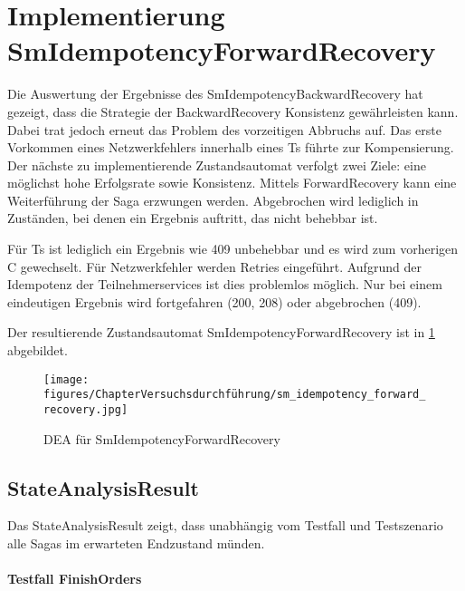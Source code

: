 \section{Implementierung SmIdempotencyForwardRecovery}
Die Auswertung der Ergebnisse des SmIdempotencyBackwardRecovery hat gezeigt, dass die Strategie der BackwardRecovery Konsistenz gewährleisten kann. Dabei trat jedoch erneut das Problem des vorzeitigen Abbruchs auf. Das erste Vorkommen eines Netzwerkfehlers innerhalb eines Ts führte zur Kompensierung. Der nächste zu implementierende Zustandsautomat verfolgt zwei Ziele: eine möglichst hohe Erfolgsrate sowie Konsistenz. Mittels ForwardRecovery kann eine Weiterführung der Saga erzwungen werden. Abgebrochen wird lediglich in Zuständen, bei denen ein Ergebnis auftritt, das nicht behebbar ist. 

Für Ts ist lediglich ein Ergebnis wie 409 unbehebbar und es wird zum vorherigen C gewechselt. Für Netzwerkfehler werden Retries eingeführt. Aufgrund der Idempotenz der Teilnehmerservices ist dies problemlos möglich. Nur bei einem eindeutigen Ergebnis wird fortgefahren (200, 208) oder abgebrochen (409). 

Der resultierende Zustandsautomat SmIdempotencyForwardRecovery ist in \cref{fig:SmIdempotencyForwardRecovery} abgebildet.


\begin{figure}[h!]
	\centering
	\texttt{[image: figures/ChapterVersuchsdurchführung/sm\_idempotency\_forward\_recovery.jpg]}
	\caption{DEA für SmIdempotencyForwardRecovery}
	\label{fig:SmIdempotencyForwardRecovery}
\end{figure}
\FloatBarrier

\subsection{StateAnalysisResult}

Das StateAnalysisResult zeigt, dass unabhängig vom Testfall und Testszenario alle Sagas im erwarteten Endzustand münden. 

\paragraph*{Testfall FinishOrders} \mbox{}\\

